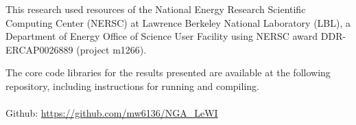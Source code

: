 \documentclass[letterpaper,twocolumn,10pt]{article}
\begin{document}
This research used resources of the National Energy Research Scientific Computing Center (NERSC) at Lawrence Berkeley National Laboratory (LBL), a Department of Energy Office of Science User Facility using NERSC award DDR-ERCAP0026889 (project m1266).

{\footnotesize 
}


\theendnotes
\noindent
The core code libraries for the results presented are available at the following repository, including instructions for running and compiling.
\\ \\ \noindent
Github: \url{https://github.com/mw6136/NGA_LeWI}
\appendix
\end{document}
